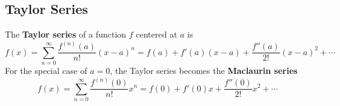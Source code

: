 \subsection{Taylor Series}
The \textbf{Taylor series} of a function \(f\) centered at \(a\) is
\[f(x)=\sum_{n=0}^{\infty}\frac{f^{(n)}(a)}{n!}(x-a)^n
=f(a)+f'(a)(x-a)+\frac{f''(a)}{2!}(x-a)^2+\cdots\]
For the special case of \(a=0\), the Taylor series becomes the
\textbf{Maclaurin series}
\[f(x)=\sum_{n=0}^{\infty}\frac{f^{(n)}(0)}{n!}x^n
=f(0)+f'(0)x+\frac{f''(0)}{2!}x^2+\cdots\]